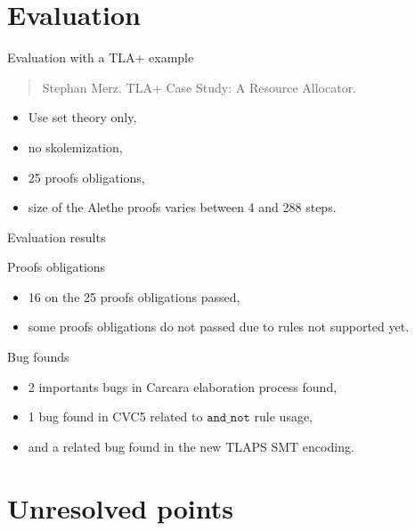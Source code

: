 \documentclass[aspectratio=169,xcolor={dvipsnames}]{beamer}
\begin{document}
\section{Evaluation}

\AtBeginSection[]
{
  \begin{frame}
    \tableofcontents[currentsection]
  \end{frame}
}

\begin{frame}{Evaluation with a TLA+ example}
\begin{quote}
Stephan Merz. TLA+ Case Study: A Resource Allocator.
\end{quote}
\begin{itemize}
    \item Use set theory only,
    \item no skolemization,
    \item 25 proofs obligations,
    \item size of the Alethe proofs varies between 4 and 288 steps.
\end{itemize}
\end{frame}

\begin{frame}{Evaluation results}
\begin{block}{Proofs obligations}
\begin{itemize}
    \item 16 on the 25 proofs obligations passed,
    \item some proofs obligations do not passed due to rules not supported yet.
\end{itemize}
\end{block}
\begin{block}{Bug founds}
\begin{itemize}
\item 2 importants bugs in Carcara elaboration process found,
\item 1 bug found in CVC5 related to $\texttt{and\_not}$ rule usage,
\item and a related bug found in the new TLAPS SMT encoding.
\end{itemize}
\end{block}
\end{frame}

\section{Unresolved points}

\AtBeginSection[]
{
  \begin{frame}
    \tableofcontents[currentsection]
  \end{frame}
}
\end{document}
